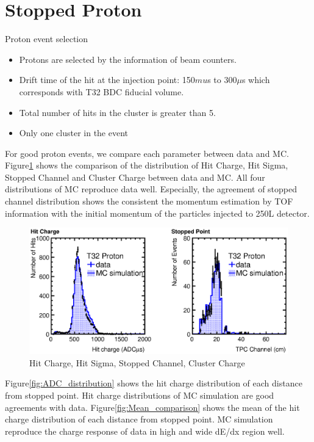 \section{Stopped Proton}
\label{Sec:Proton}

%
Proton event selection
\begin{itemize}
\item Protons are selected by the information of beam counters.
\item Drift time of the hit at the injection point: 150$mu$s to 300$\mu$s which corresponds with T32 BDC fiducial volume.
\item Total number of hits in the cluster is greater than 5.
\item Only one cluster in the event
\end{itemize}

For good proton events, we compare each parameter between data and MC.
Figure\ref{fig:various_distribution} shows the comparison of the distribution of 
Hit Charge, Hit Sigma, Stopped Channel and  Cluster Charge between data and MC.
All four distributions of MC reproduce data well.
Especially, the agreement of stopped channel distribution shows the consistent 
the momentum estimation by TOF information with the initial momentum of the particles injected to 250L detector.\\

\begin{figure}[htbp]
  \centering
  \includegraphics[width=1.0\hsize,clip]{./fig/Proton_1.eps}
  \caption{Hit Charge, Hit Sigma, Stopped Channel, Cluster Charge}
  \label{fig:various_distribution}
\end{figure}

Figure\ref{fig:ADC_distribution} shows the hit charge distribution of each distance from stopped point.
Hit charge distributions of MC simulation are good agreements with data.
Figure\ref{fig:Mean_comparison} shows the mean of the hit charge distribution of each distance from stopped point.
MC simulation reproduce the charge response of data in high and wide dE/dx region well.

